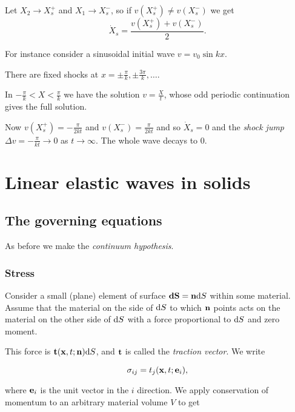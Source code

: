 \documentclass{notes}
\begin{document}
Let $X_2 \to X_s^+$ and $X_1 \to X_s^-$, so if $v(X_s^+) \neq v(X_s^-)$ we get
\[
\dot X_s = \frac{v(X_s^+) + v(X_s^-) }{2}.
\]

For instance consider a sinusoidal initial wave $v = v_0 \sin k x$.

\vspace{2in}

There are fixed shocks at $x= \pm \tfrac{\pi}{k}, \pm \tfrac{3 \pi}{k},\dots$.

In $-\tfrac{\pi}{k} < X < \tfrac{\pi}{k}$ we have the solution
$v = \tfrac{X}{t}$, whose odd periodic continuation gives the full solution.

Now $v(X_s^+) = - \tfrac{\pi}{2 k t}$ and $v(X_s^-) = \tfrac{\pi}{2 k t}$
and so $\dot X_s = 0$ and the \emph{shock jump} $\Delta v = - \tfrac{\pi}{k t}
\to 0$ as $t \to \infty$.  The whole wave decays to $0$.

\chapter[Elastic waves]{Linear elastic waves in solids}

\renewcommand{\t}{\vect{t}}

\section{The governing equations}

As before we make the \emph{continuum hypothesis}.

\subsection{Stress}

Consider a small (plane) element of surface $\mathbf{dS} = \mathbf{n} \mathrm{d} S$
within some material.  Assume that the material on the side of $\mathrm{d} S$
to which $\mathbf{n}$ points acts on the material on the other side of $\mathrm{d} S$
with a force proportional to $\mathrm{d} S$ and zero moment.

This force is $\t(\vx,t;\vn) \ud S$, and $\t$ is called the \emph{traction
vector}.  We write

\begin{equation}\label{eq:stresstens}
\sigma_{i j} = t_j(\mathbf{x},t;\mathbf{e}_i),
\end{equation}

where $\mathbf{e}_i$ is the unit vector in the $i$ direction.  We apply
conservation of momentum to an arbitrary material volume $V$ to get
\end{document}
